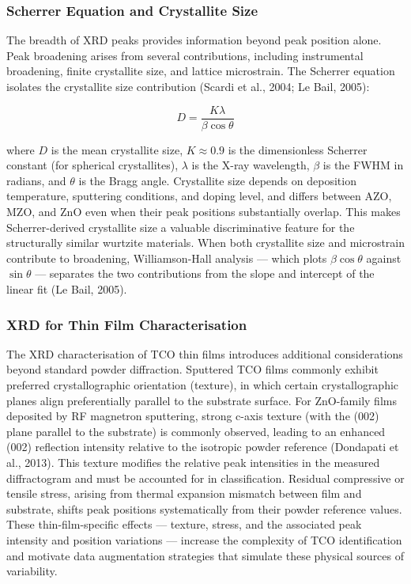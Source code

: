 \documentclass[12pt, oneside]{article} %
\begin{document}
\subsubsection{Scherrer Equation and Crystallite Size}

The breadth of XRD peaks provides information beyond peak position alone. Peak broadening arises from several contributions, including instrumental broadening, finite crystallite size, and lattice microstrain. The Scherrer equation isolates the crystallite size contribution (Scardi et al., 2004; Le Bail, 2005):

\begin{equation}
D = \frac{K\lambda}{\beta\cos\theta}
\end{equation}

where $D$ is the mean crystallite size, $K \approx 0.9$ is the dimensionless Scherrer constant (for spherical crystallites), $\lambda$ is the X-ray wavelength, $\beta$ is the FWHM in radians, and $\theta$ is the Bragg angle. Crystallite size depends on deposition temperature, sputtering conditions, and doping level, and differs between AZO, MZO, and ZnO even when their peak positions substantially overlap. This makes Scherrer-derived crystallite size a valuable discriminative feature for the structurally similar wurtzite materials. When both crystallite size and microstrain contribute to broadening, Williamson-Hall analysis --- which plots $\beta\cos\theta$ against $\sin\theta$ --- separates the two contributions from the slope and intercept of the linear fit (Le Bail, 2005).


\subsubsection{XRD for Thin Film Characterisation}

The XRD characterisation of TCO thin films introduces additional considerations beyond standard powder diffraction. Sputtered TCO films commonly exhibit preferred crystallographic orientation (texture), in which certain crystallographic planes align preferentially parallel to the substrate surface. For ZnO-family films deposited by RF magnetron sputtering, strong c-axis texture (with the (002) plane parallel to the substrate) is commonly observed, leading to an enhanced (002) reflection intensity relative to the isotropic powder reference (Dondapati et al., 2013). This texture modifies the relative peak intensities in the measured diffractogram and must be accounted for in classification. Residual compressive or tensile stress, arising from thermal expansion mismatch between film and substrate, shifts peak positions systematically from their powder reference values. These thin-film-specific effects --- texture, stress, and the associated peak intensity and position variations --- increase the complexity of TCO identification and motivate data augmentation strategies that simulate these physical sources of variability.
\end{document}
